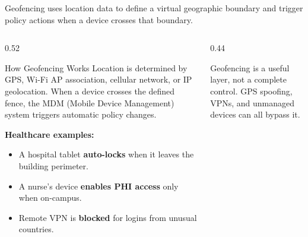 \documentclass[aspectratio=169]{beamer}  %
\begin{document}
\begin{frame}{Geofencing}
    \footnotesize
     uses location data to define a virtual geographic boundary and trigger policy actions when a device crosses that boundary.

    \vspace{0.3em}
    \begin{columns}[T]
        \begin{column}{0.52\textwidth}
            \begin{block}{How Geofencing Works}
                \footnotesize
                Location is determined by GPS, Wi-Fi AP association, cellular network, or IP geolocation. When a device crosses the defined fence, the MDM (Mobile Device Management) system triggers automatic policy changes.

                \vspace{0.2em}
                \textbf{Healthcare examples:}
                \begin{itemize}
                    \item A hospital tablet \textbf{auto-locks} when it leaves the building perimeter.
                    \item A nurse's device \textbf{enables PHI access} only when on-campus.
                    \item Remote VPN is \textbf{blocked} for logins from unusual countries.
                \end{itemize}
            \end{block}
        \end{column}
        \begin{column}{0.44\textwidth}
            \begin{center}
            \end{center}
            \begin{alertblock}{}
                \scriptsize
                Geofencing is a useful layer, not a complete control. GPS spoofing, VPNs, and unmanaged devices can all bypass it.
            \end{alertblock}
        \end{column}
    \end{columns}
\end{frame}
\end{document}
